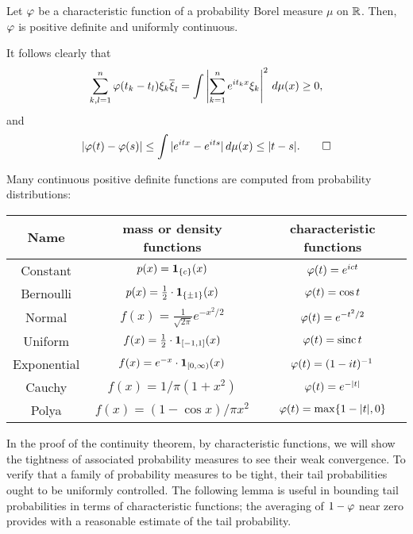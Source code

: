 \documentclass[12pt]{article}
\begin{document}
\begin{prop}
Let $\varphi$ be a characteristic function of a probability Borel measure $\mu$ on $\mathbb{R}$.
Then, $\varphi$ is positive definite and uniformly continuous.
\end{prop}
\begin{pf}
It follows clearly that
\[\sum_{k,l=1}^n\varphi(t_k-t_l)\xi_k\overline\xi_l=\int\left|\sum_{k=1}^ne^{it_kx}\xi_k\right|^2\,d\mu(x)\ge0,\]
and
\[|\varphi(t)-\varphi(s)|\le\int|e^{itx}-e^{its}|\,d\mu(x)\le|t-s|.\qedhere\]
\end{pf}
\begin{ex}
Many continuous positive definite functions are computed from probability distributions:
\begin{center}\renewcommand{\arraystretch}{1.8}
\begin{tabular}{ccc}
Name & mass or density functions & characteristic functions\\
\hline
Constant & $p(x)=\mathbf{1}_{\{c\}}(x)$ & $\varphi(t)=e^{ict}$\\
Bernoulli & $p(x)=\frac12\cdot\mathbf{1}_{\{\pm1\}}(x)$ & $\varphi(t)=\cos t$\\
Normal & $f(x)=\frac1{\sqrt{2\pi}}e^{-x^2/2}$ & $\varphi(t)=e^{-t^2/2}$\\
Uniform & $f(x)=\frac12\cdot\mathbf{1}_{[-1,1]}(x)$ & $\varphi(t)=\operatorname{sinc}t$\\
Exponential & $f(x)=e^{-x}\cdot\mathbf{1}_{[0,\infty)}(x)$ & $\varphi(t)=(1-it)^{-1}$\\
Cauchy & $f(x)=1/\pi(1+x^2)$ & $\varphi(t)=e^{-|t|}$\\
Polya & $f(x)=(1-\cos x)/\pi x^2$ & $\varphi(t)=\max\{1-|t|,0\}$
\end{tabular}
\end{center}
\end{ex}



In the proof of the continuity theorem, by characteristic functions, we will show the tightness of associated probability measures to see their weak convergence.
To verify that a family of probability measures to be tight, their tail probabilities ought to be uniformly controlled.
The following lemma is useful in bounding tail probabilities in terms of characteristic functions; the averaging of $1-\varphi$ near zero provides with a reasonable estimate of the tail probability.
\end{document}
